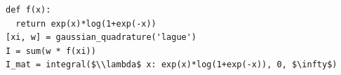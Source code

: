 \documentclass[border=10pt]{standalone}
\begin{document}
\begin{lstlisting}
def f(x):
  return exp(x)*log(1+exp(-x))
[xi, w] = gaussian_quadrature('lague')
I = sum(w * f(xi))
I_mat = integral($\\lambda$ x: exp(x)*log(1+exp(-x)), 0, $\infty$)
\end{lstlisting}
\end{document}
